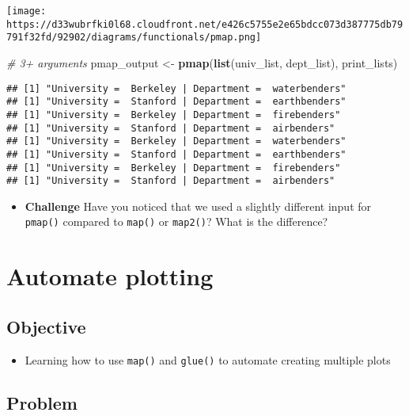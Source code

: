 \documentclass[
]{book}
\newenvironment{Shaded}{\begin{snugshade}}{\end{snugshade}}
\newcommand{\CommentTok}[1]{\textcolor[rgb]{0.56,0.35,0.01}{\textit{#1}}}
\newcommand{\KeywordTok}[1]{\textcolor[rgb]{0.13,0.29,0.53}{\textbf{#1}}}
\newcommand{\NormalTok}[1]{#1}
\newcommand{\StringTok}[1]{\textcolor[rgb]{0.31,0.60,0.02}{#1}}
\providecommand{\tightlist}{%
  \setlength{\itemsep}{0pt}\setlength{\parskip}{0pt}}
\begin{document}
\texttt{[image: https://d33wubrfki0l68.cloudfront.net/e426c5755e2e65bdcc073d387775db79791f32fd/92902/diagrams/functionals/pmap.png]}

\begin{Shaded}
\begin{Highlighting}[]
\CommentTok{\# 3+ arguments}
\NormalTok{pmap\_output \textless{}{-}}\StringTok{ }\KeywordTok{pmap}\NormalTok{(}\KeywordTok{list}\NormalTok{(univ\_list, dept\_list), print\_lists)}
\end{Highlighting}
\end{Shaded}

\begin{verbatim}
## [1] "University =  Berkeley | Department =  waterbenders"
## [1] "University =  Stanford | Department =  earthbenders"
## [1] "University =  Berkeley | Department =  firebenders"
## [1] "University =  Stanford | Department =  airbenders"
## [1] "University =  Berkeley | Department =  waterbenders"
## [1] "University =  Stanford | Department =  earthbenders"
## [1] "University =  Berkeley | Department =  firebenders"
## [1] "University =  Stanford | Department =  airbenders"
\end{verbatim}

\begin{itemize}
\tightlist
\item
  \textbf{Challenge} Have you noticed that we used a slightly different input for \texttt{pmap()} compared to \texttt{map()} or \texttt{map2()}? What is the difference?
\end{itemize}

\hypertarget{automate-plotting}{%
\section{Automate plotting}\label{automate-plotting}}

\hypertarget{objective}{%
\subsection{Objective}\label{objective}}

\begin{itemize}
\tightlist
\item
  Learning how to use \texttt{map()} and \texttt{glue()} to automate creating multiple plots
\end{itemize}

\hypertarget{problem-1}{%
\subsection{Problem}\label{problem-1}}
\end{document}
